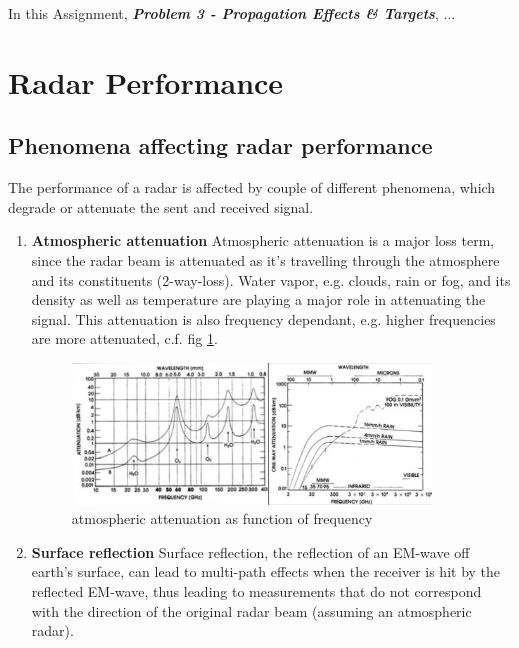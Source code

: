 

In this Assignment, \textit{\textbf{Problem 3 - Propagation Effects \& Targets}}, ...


\section{Radar Performance}

\subsection{Phenomena affecting radar performance}
The performance of a radar is affected by couple of different phenomena, which degrade or attenuate the sent and received signal.
\begin{enumerate}
	\item \textbf{Atmospheric attenuation} \newline
			Atmospheric attenuation is a major loss term, since the radar beam is attenuated as it's travelling through the atmosphere and its constituents (2-way-loss).
			Water vapor, e.g. clouds, rain or fog, and its density as well as temperature are playing a major role in attenuating the signal. This attenuation is also frequency dependant, e.g. higher frequencies are more attenuated, c.f. fig \ref{fig:attenuation}.
			\begin{figure}[!htbp]
			\centering
			\includegraphics[width=0.9\textwidth]{images/attenuation}
			\caption{atmospheric attenuation as function of frequency \citep{erickson:lecture}}
			\label{fig:attenuation}
			\end{figure}
	\item \textbf{Surface reflection} \newline
			Surface reflection, the reflection of an EM-wave off earth's surface, can lead to multi-path effects when the receiver is hit by the reflected EM-wave, thus leading to measurements that do not correspond with the direction of the original radar beam (assuming an atmospheric radar).

\end{enumerate}
